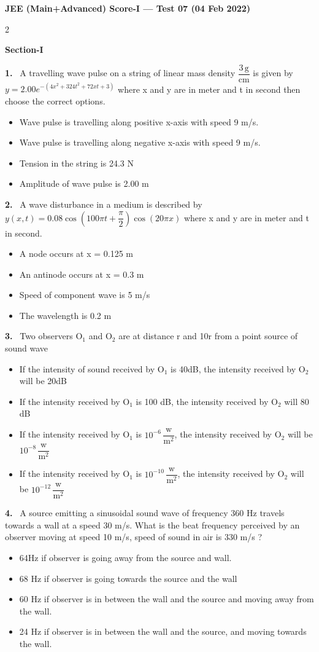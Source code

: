 \documentclass[10pt]{extarticle}
\newcommand{\partsec}[2]{\par\medskip\noindent{\large\bfseries PART-#1: #2}\par\smallskip}
\newcommand{\sect}[1]{\par\smallskip\noindent\textbf{#1}\par}
\newcommand{\qn}[1]{\par\smallskip\noindent\textbf{#1.}~}
\newenvironment{qoptions}{\begin{itemize}[leftmargin=1.8em,itemsep=1pt,topsep=2pt,label={}]}{\end{itemize}}
\newcommand{\opt}[2]{\item[(#1)] #2}
\begin{document}
\begin{center}{\Large\bfseries JEE (Main+Advanced) Score-I --- Test 07 (04 Feb 2022)}\end{center}
\begin{multicols}{2}
\raggedcolumns
\partsec{1}{PHYSICS}
\sect{Section-I}
\qn{1} A travelling wave pulse on a string of linear mass density $\dfrac{3\,\mathrm g}{\mathrm{cm}}$ is given by $y=2.00e^{-\left(4x^2+324t^2+72xt+3\right)}$ where x and y are in meter and t in second then choose the correct options.
\begin{qoptions}
\opt{A}{Wave pulse is travelling along positive x-axis with speed 9 m/s.}
\opt{B}{Wave pulse is travelling along negative x-axis with speed 9 m/s.}
\opt{C}{Tension in the string is 24.3 N}
\opt{D}{Amplitude of wave pulse is 2.00 m}
\end{qoptions}
\qn{2} A wave disturbance in a medium is described by $y(x,t)=0.08\cos\left(100\pi t+\dfrac{\pi}{2}\right)\cos(20\pi x)$ where x and y are in meter and t in second.
\begin{qoptions}
\opt{A}{A node occurs at x = 0.125 m}
\opt{B}{An antinode occurs at x = 0.3 m}
\opt{C}{Speed of component wave is 5 m/s}
\opt{D}{The wavelength is 0.2 m}
\end{qoptions}
\qn{3} Two observers O$_1$ and O$_2$ are at distance r and 10r from a point source of sound wave
\begin{qoptions}
\opt{A}{If the intensity of sound received by O$_1$ is 40dB, the intensity received by O$_2$ will be 20dB}
\opt{B}{If the intensity received by O$_1$ is 100 dB, the intensity received by O$_2$ will 80 dB}
\opt{C}{If the intensity received by O$_1$ is $10^{-6}\,\dfrac{\mathrm w}{\mathrm m^2}$, the intensity received by O$_2$ will be $10^{-8}\,\dfrac{\mathrm w}{\mathrm m^2}$}
\opt{D}{If the intensity received by O$_1$ is $10^{-10}\,\dfrac{\mathrm w}{\mathrm m^2}$, the intensity received by O$_2$ will be $10^{-12}\,\dfrac{\mathrm w}{\mathrm m^2}$}
\end{qoptions}
\qn{4} A source emitting a sinusoidal sound wave of frequency 360 Hz travels towards a wall at a speed 30 m/s. What is the beat frequency perceived by an observer moving at speed 10 m/s, speed of sound in air is 330 m/s ?
\begin{qoptions}
\opt{A}{64Hz if observer is going away from the source and wall.}
\opt{B}{68 Hz if observer is going towards the source and the wall}
\opt{C}{60 Hz if observer is in between the wall and the source and moving away from the wall.}
\opt{D}{24 Hz if observer is in between the wall and the source, and moving towards the wall.}

\end{qoptions}
\end{multicols}
\end{document}
